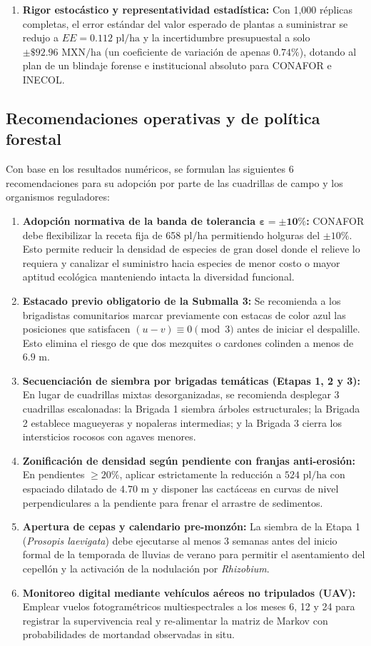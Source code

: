 \documentclass[11pt,a4paper]{article}
\begin{document}
\begin{enumerate}[leftmargin=1.5em]
    \item \textbf{Rigor estocástico y representatividad estadística:} Con 1,000 réplicas completas, el error estándar del valor esperado de plantas a suministrar se redujo a $EE = 0.112\text{ pl/ha}$ y la incertidumbre presupuestal a solo $\pm \$92.96\text{ MXN/ha}$ (un coeficiente de variación de apenas $0.74\%$), dotando al plan de un blindaje forense e institucional absoluto para CONAFOR e INECOL.
\end{enumerate}

\subsection{Recomendaciones operativas y de política forestal}
Con base en los resultados numéricos, se formulan las siguientes 6 recomendaciones para su adopción por parte de las cuadrillas de campo y los organismos reguladores:
\begin{enumerate}[leftmargin=1.5em]
    \item \textbf{Adopción normativa de la banda de tolerancia $\boldsymbol{\varepsilon = \pm 10\%}$:} CONAFOR debe flexibilizar la receta fija de 658 pl/ha permitiendo holguras del $\pm 10\%$. Esto permite reducir la densidad de especies de gran dosel donde el relieve lo requiera y canalizar el suministro hacia especies de menor costo o mayor aptitud ecológica manteniendo intacta la diversidad funcional.
    \item \textbf{Estacado previo obligatorio de la Submalla 3:} Se recomienda a los brigadistas comunitarios marcar previamente con estacas de color azul las posiciones que satisfacen $(u-v)\equiv 0\pmod 3$ antes de iniciar el despalille. Esto elimina el riesgo de que dos mezquites o cardones colinden a menos de $6.9\text{ m}$.
    \item \textbf{Secuenciación de siembra por brigadas temáticas (Etapas 1, 2 y 3):} En lugar de cuadrillas mixtas desorganizadas, se recomienda desplegar 3 cuadrillas escalonadas: la Brigada 1 siembra árboles estructurales; la Brigada 2 establece magueyeras y nopaleras intermedias; y la Brigada 3 cierra los intersticios rocosos con agaves menores.
    \item \textbf{Zonificación de densidad según pendiente con franjas anti-erosión:} En pendientes $\ge 20\%$, aplicar estrictamente la reducción a $524\text{ pl/ha}$ con espaciado dilatado de $4.70\text{ m}$ y disponer las cactáceas en curvas de nivel perpendiculares a la pendiente para frenar el arrastre de sedimentos.
    \item \textbf{Apertura de cepas y calendario pre-monzón:} La siembra de la Etapa 1 (\textit{Prosopis laevigata}) debe ejecutarse al menos 3 semanas antes del inicio formal de la temporada de lluvias de verano para permitir el asentamiento del cepellón y la activación de la nodulación por \textit{Rhizobium}.
    \item \textbf{Monitoreo digital mediante vehículos aéreos no tripulados (UAV):} Emplear vuelos fotogramétricos multiespectrales a los meses 6, 12 y 24 para registrar la supervivencia real y re-alimentar la matriz de Markov con probabilidades de mortandad observadas in situ.
\end{enumerate}
\end{document}
